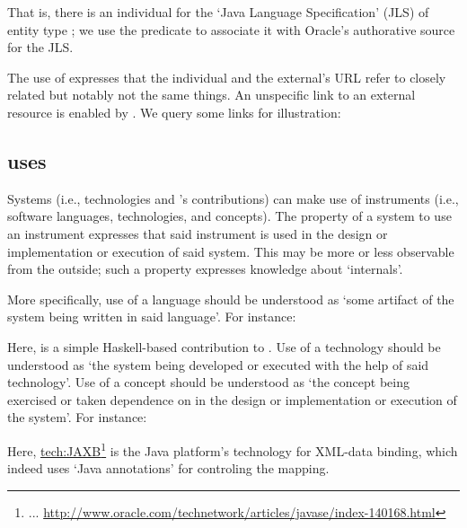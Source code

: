 \noindent
That is, there is an \solasote{} individual for the `Java Language
Specification' (JLS) of entity type ; we use the
 predicate to associate it with Oracle's authorative
source for the JLS.

The use of  expresses that the \solasote{}
individual and the external's URL refer to closely related but notably
not the same things. An unspecific link to an external resource is
enabled by . We query some links for illustration:




\subsection{uses} 
\label{S:uses}

Systems (i.e., technologies and \ooo{}'s contributions) can make use
of instruments (i.e., software languages, technologies, and
concepts). The property of a system to use an instrument expresses
that said instrument is used in the design or implementation or
execution of said system. This may be more or less observable from the
outside; such a property expresses knowledge about `internals'.

More specifically, use of a language should be understood as `some
artifact of the system being written in said language'. For instance:


\noindent
Here,  is a simple Haskell-based contribution
to \ooo{}. Use of a technology should be understood as `the system
being developed or executed with the help of said technology'. Use of
a concept should be understood as `the concept being exercised or
taken dependence on in the design or implementation or execution of
the system'. For instance:


\noindent
Here, \url{tech:JAXB}\footnote{... 
  \url{http://www.oracle.com/technetwork/articles/javase/index-140168.html}}
is the Java platform's technology for XML-data binding, which indeed
uses `Java annotations' for controling the mapping.


